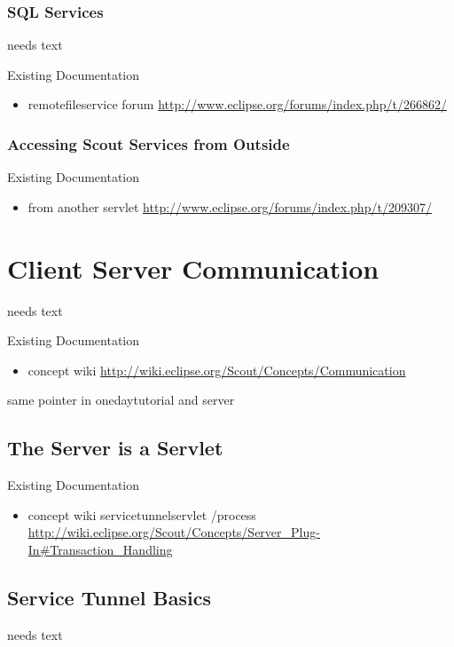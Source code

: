 \documentclass[a4paper,10pt,twoside]{book}
\begin{document}
\subsection{SQL Services}
needs text

\noindent Existing Documentation
\begin{itemize}
  \item remotefileservice forum \url{http://www.eclipse.org/forums/index.php/t/266862/}
\end{itemize}

\subsection{Accessing Scout Services from Outside}

\noindent Existing Documentation
\begin{itemize}
  \item from another servlet \url{http://www.eclipse.org/forums/index.php/t/209307/}
\end{itemize}


\chapter{Client Server Communication}
needs text

\noindent Existing Documentation
\begin{itemize}
  \item concept wiki \url{http://wiki.eclipse.org/Scout/Concepts/Communication}
\end{itemize}

same pointer in onedaytutorial and server

\section{The Server is a Servlet}

\noindent Existing Documentation
\begin{itemize}
  \item concept wiki servicetunnelservlet /process \url{http://wiki.eclipse.org/Scout/Concepts/Server_Plug-In#Transaction_Handling}
\end{itemize}

\section{Service Tunnel Basics}
needs text
\end{document}
